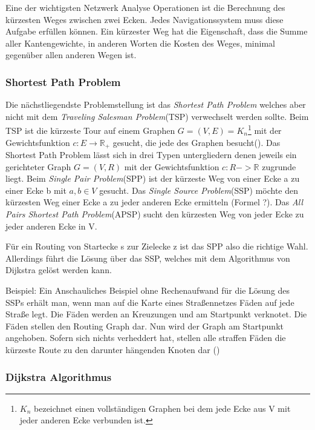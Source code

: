 \documentclass[12pt,a4paper]{article}
\begin{document}
Eine der wichtigsten Netzwerk Analyse Operationen ist die Berechnung des kürzesten Weges zwischen zwei Ecken. Jedes Navigationssystem muss diese Aufgabe erfüllen können. Ein kürzester Weg hat die Eigenschaft, dass die Summe aller Kantengewichte, in anderen Worten die Kosten des Weges, minimal gegenüber allen anderen Wegen ist.

\subsubsection{Shortest Path Problem}
Die nächstliegendste Problemstellung ist das \textit{Shortest Path Problem} welches aber nicht mit dem \textit{Traveling Salesman Problem}(TSP) verwechselt werden sollte. Beim TSP ist die kürzeste Tour auf einem Graphen $G  = (V,E) = K_{n}$\footnote{$K_{n}$ bezeichnet einen vollständigen Graphen bei dem jede Ecke aus V mit jeder anderen Ecke verbunden ist.} mit der Gewichtsfunktion $c: E \rightarrow \mathbb{R}_{+}$ gesucht, die jede des Graphen besucht(\cite[135]{algorithms}).
Das Shortest Path Problem lässt sich in drei Typen untergliedern denen jeweils ein gerichteter Graph $G = (V,R)$ mit der Gewichtsfunktion $c: R -> \mathbb{R}$ zugrunde liegt. Beim \textit{Single Pair Problem}(SPP) ist der kürzeste Weg von einer Ecke a zu einer Ecke b mit $a,b\in V$ gesucht. Das \textit{Single Source Problem}(SSP) möchte den kürzesten Weg einer Ecke a zu jeder anderen Ecke ermitteln (Formel ?). Das \textit{All Pairs Shortest Path Problem}(APSP) sucht den kürzesten Weg von jeder Ecke zu jeder anderen Ecke in V. \cite[169f]{algorithms}

Für ein Routing von Startecke s zur Zielecke z ist das SPP also die richtige Wahl. Allerdings führt die Lösung über das SSP, welches mit dem Algorithmus von Dijkstra gelöst werden kann.

Beispiel:
Ein Anschauliches Beispiel ohne Rechenaufwand für die Lösung des SSPs erhält man, wenn man auf die Karte eines Straßennetzes Fäden auf jede Straße legt. Die Fäden werden an Kreuzungen und am Startpunkt verknotet. Die Fäden stellen den Routing Graph dar. Nun wird der Graph am Startpunkt angehoben. Sofern sich nichts verheddert hat, stellen alle straffen Fäden die kürzeste Route zu den darunter hängenden Knoten dar (\cite[191]{kurt})


\subsubsection{Dijkstra Algorithmus}
\end{document}
